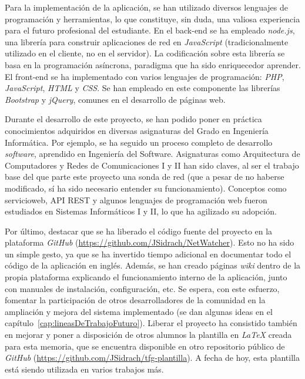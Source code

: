 Para la implementación de la aplicación, se han utilizado diversos lenguajes de programación y herramientas, lo que constituye, sin duda, una valiosa experiencia para el futuro profesional del estudiante.
En el \gls{back-end} se ha empleado \textit{node.js}, una librería para construir aplicaciones de red en \textit{JavaScript} (tradicionalmente utilizado en el cliente, no en el servidor).
La codificación sobre esta librería se basa en la programación asíncrona, paradigma que ha sido enriquecedor aprender.
El \gls{front-end} se ha implementado con varios lenguajes de programación: \textit{PHP}, \textit{JavaScript}, \textit{HTML} y \textit{CSS}.
Se han empleado en este componente las librerías \textit{Bootstrap} y \textit{jQuery}, comunes en el desarrollo de páginas web.

Durante el desarrollo de este proyecto, se han podido poner en práctica conocimientos adquiridos en diversas asignaturas del Grado en Ingeniería Informática.
Por ejemplo, se ha seguido un proceso completo de desarrollo \textit{software}, aprendido en Ingeniería del Software.
Asignaturas como Arquitectura de Computadores y Redes de Comunicaciones I y II han sido claves, al ser el trabajo base del que parte este proyecto una sonda de red (que a pesar de no haberse modificado, sí ha sido necesario entender su funcionamiento).
Conceptos como \gls{servicioweb}, \gls{API} \gls{REST} y algunos lenguajes de programación web fueron estudiados en Sistemas Informáticos I y II, lo que ha agilizado su adopción.

Por último, destacar que se ha liberado el código fuente del proyecto en la plataforma \textit{GitHub} (\url{https://github.com/JSidrach/NetWatcher}).
Esto no ha sido un simple gesto, ya que se ha invertido tiempo adicional en documentar todo el código de la aplicación en inglés.
Además, se han creado páginas \textit{wiki} dentro de la propia plataforma explicando el funcionamiento interno de la aplicación, junto con manuales de instalación, configuración, etc.
Se espera, con este esfuerzo, fomentar la participación de otros desarrolladores de la comunidad en la ampliación y mejora del sistema implementado (se dan algunas ideas en el capítulo~\ref{cap:lineasDeTrabajoFuturo}).
Liberar el proyecto ha consistido también en mejorar y poner a disposición de otros alumnos la plantilla en \textit{LaTeX} creada para esta memoria, que se encuentra disponible en otro repositorio público de \textit{GitHub} (\url{https://github.com/JSidrach/tfg-plantilla}).
A fecha de hoy, esta plantilla está siendo utilizada en varios trabajos más.
